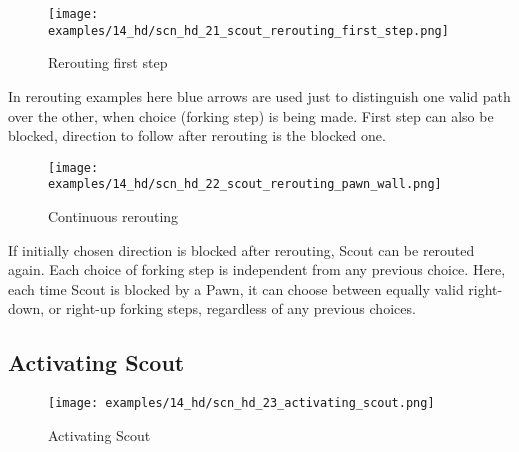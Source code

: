 \vspace*{-0.7\baselineskip}
\noindent
\begin{wrapfigure}[8]{l}{0.41\textwidth}
\centering
\texttt{[image: examples/14\_hd/scn\_hd\_21\_scout\_rerouting\_first\_step.png]}
\vspace*{-0.3\baselineskip}
\caption{Rerouting first step}
\label{fig:scn_hd_21_scout_rerouting_first_step}
\end{wrapfigure}
\indent
In rerouting examples here blue arrows are used just to distinguish one valid path over
the other, when choice (forking step) is being made. \newline
\indent
First step can also be blocked, direction to follow after rerouting is the blocked one.

\vspace*{0.3\baselineskip}
\noindent
\begin{wrapfigure}[10]{l}{0.41\textwidth}
\centering
\texttt{[image: examples/14\_hd/scn\_hd\_22\_scout\_rerouting\_pawn\_wall.png]}
\vspace*{-0.3\baselineskip}
\caption{Continuous rerouting}
\label{fig:scn_hd_22_scout_rerouting_pawn_wall}
\end{wrapfigure}
\indent
If initially chosen direction is blocked after rerouting, Scout can be rerouted
again. Each choice of forking step is independent from any previous choice. \newline
\indent
Here, each time Scout is blocked by a Pawn, it can choose between equally valid
right-down, or right-up forking steps, regardless of any previous choices.

\clearpage %

\subsection*{Activating Scout}
\label{sec:Hemera's Dawn/Scout/Activating Scout}

\vspace*{-1.3\baselineskip}
\noindent
\begin{figure}[!h]
\texttt{[image: examples/14\_hd/scn\_hd\_23\_activating\_scout.png]}
\vspace*{-1.3\baselineskip}
\caption{Activating Scout}
\label{fig:scn_hd_23_activating_scout}
\end{figure}

